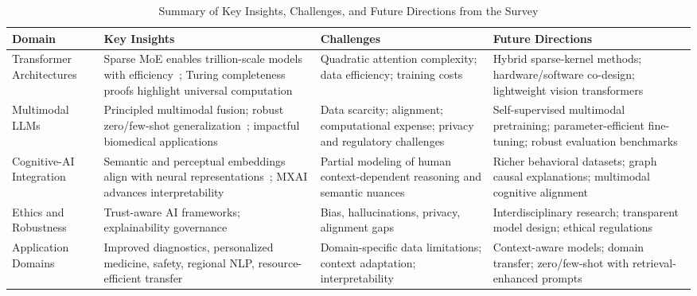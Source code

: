 \documentclass[sigconf]{acmart}
\begin{document}
\begin{table*}[htbp]
\centering
\caption{Summary of Key Insights, Challenges, and Future Directions from the Survey}
\label{tab:conclusion_summary}
\begin{adjustbox}{max width=\textwidth}
\begin{tabular}{@{}llll@{}}
\toprule
\textbf{Domain} & \textbf{Key Insights} & \textbf{Challenges} & \textbf{Future Directions} \\
\midrule
Transformer Architectures & 
Sparse MoE enables trillion-scale models with efficiency~\cite{ref14}; Turing completeness proofs highlight universal computation~\cite{ref15} & 
Quadratic attention complexity; data efficiency; training costs~\cite{ref21,ref22} & 
Hybrid sparse-kernel methods; hardware/software co-design; lightweight vision transformers~\cite{ref21,ref22} \\
\addlinespace
Multimodal LLMs &
Principled multimodal fusion; robust zero/few-shot generalization~\cite{ref28}; impactful biomedical applications~\cite{ref12} & 
Data scarcity; alignment; computational expense; privacy and regulatory challenges~\cite{ref12,ref28} & 
Self-supervised multimodal pretraining; parameter-efficient fine-tuning; robust evaluation benchmarks~\cite{ref28} \\
\addlinespace
Cognitive-AI Integration &
Semantic and perceptual embeddings align with neural representations~\cite{ref23}; MXAI advances interpretability~\cite{ref25,ref26} & 
Partial modeling of human context-dependent reasoning and semantic nuances~\cite{ref24} & 
Richer behavioral datasets; graph causal explanations; multimodal cognitive alignment~\cite{ref24,ref26} \\
\addlinespace
Ethics and Robustness &
Trust-aware AI frameworks; explainability governance~\cite{ref11,ref25,ref28} & 
Bias, hallucinations, privacy, alignment gaps~\cite{ref29,ref30} & 
Interdisciplinary research; transparent model design; ethical regulations~\cite{ref29,ref30} \\
\addlinespace
Application Domains &
Improved diagnostics, personalized medicine, safety, regional NLP, resource-efficient transfer~\cite{ref21,ref22,ref27,ref30,ref31} & 
Domain-specific data limitations; context adaptation; interpretability~\cite{ref21,ref30} & 
Context-aware models; domain transfer; zero/few-shot with retrieval-enhanced prompts~\cite{ref34,ref40} \\
\bottomrule
\end{tabular}
\end{adjustbox}
\end{table*}
\end{document}
